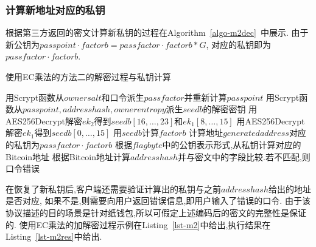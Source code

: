 \subsubsection{计算新地址对应的私钥}
根据第三方返回的密文计算新私钥的过程在Algorithm~\ref{algo-m2dec}~中展示.
由于新公钥为$passpoint\cdot factorb=passfactor\cdot factorb *G$,
对应的私钥即为$passfactor\cdot factorb$.

\begin{algorithm}[h]\footnotesize
\caption{使用EC乘法的方法二的解密过程与私钥计算}\label{algo-m2dec}
  	\begin{algorithmic}[1]
	   \STATE  用Scrypt函数从$ownersalt$和口令派生$passfactor$并重新计算$passpoint$
	   \STATE 用Scrypt函数从$passpoint, addresshash, ownerentropy$派生$seedb$的解密密钥
		\STATE 用\textsf{AES256Decrypt}解密$ek_2$得到$seedb[16,\dots,23]$和$ek_1[8,\dots,15]$
		\STATE 用\textsf{AES256Decrypt}解密$ek_1$得到$seedb[0,\dots,15]$
		\STATE 用$seedb$计算$factorb$
		\STATE 计算地址$generatedaddress$对应的私钥为$passfactor \cdot factorb$
		\STATE 根据$flagbyte$中的公钥表示形式,从私钥计算对应的Bitcoin地址
		\STATE 根据Bitcoin地址计算$addresshash$并与密文中的字段比较.若不匹配,则口令错误
    \end{algorithmic}
\end{algorithm}

在恢复了新私钥后,客户端还需要验证计算出的私钥与之前$addresshash$给出的地址是否对应,
如果不是,则需要向用户返回错误信息,即用户输入了错误的口令.
由于该协议描述的目的场景是针对纸钱包,所以可假定上述编码后的密文的完整性是保证的.
使用EC乘法的加解密过程示例在Listing~\ref{lst-m2}中给出,执行结果在Listing~\ref{lst-m2res}中给出.


